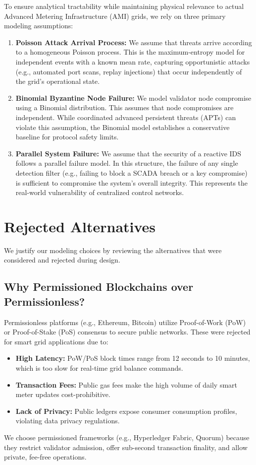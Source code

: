 \documentclass[12pt, oneside, a4paper]{report}
\theoremstyle{definition}
\theoremstyle{remark}
\begin{document}
To ensure analytical tractability while maintaining physical relevance to actual Advanced Metering Infrastructure (AMI) grids, we rely on three primary modeling assumptions:
\begin{enumerate}
  \item \textbf{Poisson Attack Arrival Process:} We assume that threats arrive according to a homogeneous Poisson process. This is the maximum-entropy model for independent events with a known mean rate, capturing opportunistic attacks (e.g., automated port scans, replay injections) that occur independently of the grid's operational state.
  \item \textbf{Binomial Byzantine Node Failure:} We model validator node compromise using a Binomial distribution. This assumes that node compromises are independent. While coordinated advanced persistent threats (APTs) can violate this assumption, the Binomial model establishes a conservative baseline for protocol safety limits.
  \item \textbf{Parallel System Failure:} We assume that the security of a reactive IDS follows a parallel failure model. In this structure, the failure of any single detection filter (e.g., failing to block a SCADA breach or a key compromise) is sufficient to compromise the system's overall integrity. This represents the real-world vulnerability of centralized control networks.
\end{enumerate}

\section{Rejected Alternatives}
\label{sec:dd:alternatives}

We justify our modeling choices by reviewing the alternatives that were considered and rejected during design.

\subsection{Why Permissioned Blockchains over Permissionless?}
Permissionless platforms (e.g., Ethereum, Bitcoin) utilize Proof-of-Work (PoW) or Proof-of-Stake (PoS) consensus to secure public networks. These were rejected for smart grid applications due to:
\begin{itemize}
  \item \textbf{High Latency:} PoW/PoS block times range from 12 seconds to 10 minutes, which is too slow for real-time grid balance commands.
  \item \textbf{Transaction Fees:} Public gas fees make the high volume of daily smart meter updates cost-prohibitive.
  \item \textbf{Lack of Privacy:} Public ledgers expose consumer consumption profiles, violating data privacy regulations.
\end{itemize}
We choose permissioned frameworks (e.g., Hyperledger Fabric, Quorum) because they restrict validator admission, offer sub-second transaction finality, and allow private, fee-free operations.
\end{document}
